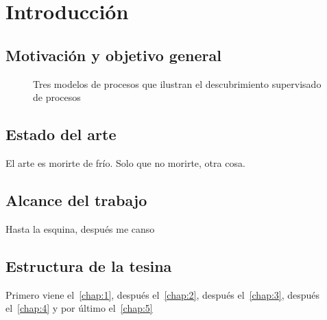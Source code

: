 \chapter{Introducción}
\label{chap:1}

\section{Motivación y objetivo general}
\label{sec:mot}

\begin{figure}[H]
    \centering
    \subbottom[\label{sfig:mot.1}]{\scalebox{.9}{}}
    \hspace{10mm}
    \subbottom[\label{sfig:mot.2}]{\scalebox{.9}{}}
    \hspace{10mm}
    \subbottom[\label{sfig:mot.3}]{\scalebox{.9}{}}
    \hspace{10mm}
    \subbottom[\label{sfig:mot.4}]{\scalebox{.9}{}}
    \caption{Tres modelos de procesos que ilustran el descubrimiento supervisado de procesos}
    \label{fig:mot}
\end{figure}


\section{Estado del arte}
\label{sec:antecedentes}
El arte es morirte de frío. Solo que no morirte, otra cosa.

\section{Alcance del trabajo}
\label{sec:alcance}
Hasta la esquina, después me canso

\section{Estructura de la tesina}
\label{sec:estructura}
Primero viene el~\autoref{chap:1},
después el~\autoref{chap:2},
después el~\autoref{chap:3},
después el~\autoref{chap:4}
y por último el~\autoref{chap:5}
